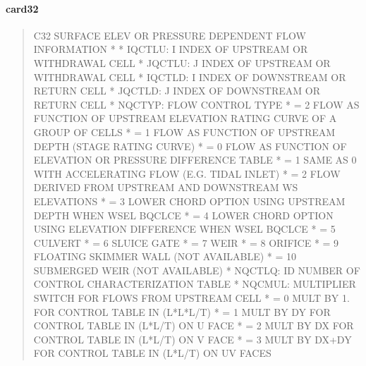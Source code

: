 \documentclass[letterpaper,10pt,english]{sphinxmanual}
\begin{document}
\paragraph{card32}
\label{\detokenize{inputfiles/runcontrol/card32:card32}}\label{\detokenize{inputfiles/runcontrol/card32::doc}}\begin{quote}

\begin{sphinxVerbatim}[commandchars=\\\{\}]
\PYGZhy{}\PYGZhy{}\PYGZhy{}\PYGZhy{}\PYGZhy{}\PYGZhy{}\PYGZhy{}\PYGZhy{}\PYGZhy{}\PYGZhy{}\PYGZhy{}\PYGZhy{}\PYGZhy{}\PYGZhy{}\PYGZhy{}\PYGZhy{}\PYGZhy{}\PYGZhy{}\PYGZhy{}\PYGZhy{}\PYGZhy{}\PYGZhy{}\PYGZhy{}\PYGZhy{}\PYGZhy{}\PYGZhy{}\PYGZhy{}\PYGZhy{}\PYGZhy{}\PYGZhy{}\PYGZhy{}\PYGZhy{}\PYGZhy{}\PYGZhy{}\PYGZhy{}\PYGZhy{}\PYGZhy{}\PYGZhy{}\PYGZhy{}\PYGZhy{}\PYGZhy{}\PYGZhy{}\PYGZhy{}\PYGZhy{}\PYGZhy{}\PYGZhy{}\PYGZhy{}\PYGZhy{}\PYGZhy{}\PYGZhy{}\PYGZhy{}\PYGZhy{}\PYGZhy{}\PYGZhy{}\PYGZhy{}\PYGZhy{}\PYGZhy{}\PYGZhy{}\PYGZhy{}\PYGZhy{}\PYGZhy{}\PYGZhy{}\PYGZhy{}\PYGZhy{}\PYGZhy{}\PYGZhy{}\PYGZhy{}\PYGZhy{}\PYGZhy{}\PYGZhy{}\PYGZhy{}\PYGZhy{}\PYGZhy{}\PYGZhy{}\PYGZhy{}\PYGZhy{}\PYGZhy{}\PYGZhy{}
C32 SURFACE ELEV OR PRESSURE DEPENDENT FLOW INFORMATION
*
*  IQCTLU:  I INDEX OF UPSTREAM OR WITHDRAWAL CELL
*  JQCTLU:  J INDEX OF UPSTREAM OR WITHDRAWAL CELL
*  IQCTLD:  I INDEX OF DOWNSTREAM OR RETURN CELL
*  JQCTLD:  J INDEX OF DOWNSTREAM OR RETURN CELL
*  NQCTYP:  FLOW CONTROL TYPE
*           = \PYGZhy{}2 FLOW AS FUNCTION OF UPSTREAM ELEVATION RATING CURVE OF A GROUP OF CELLS
*           = \PYGZhy{}1 FLOW AS FUNCTION OF UPSTREAM DEPTH (STAGE RATING CURVE)
*           = 0  FLOW AS FUNCTION OF ELEVATION OR PRESSURE DIFFERENCE TABLE
*           = 1  SAME AS 0 WITH ACCELERATING FLOW (E.G. TIDAL INLET)
*           = 2  FLOW DERIVED FROM UPSTREAM AND DOWNSTREAM WS ELEVATIONS
*           = 3  LOWER CHORD OPTION USING UPSTREAM DEPTH       WHEN WSEL \PYGZgt{} BQCLCE
*           = 4  LOWER CHORD OPTION USING ELEVATION DIFFERENCE WHEN WSEL \PYGZgt{} BQCLCE
*           = 5  CULVERT
*           = 6  SLUICE GATE
*           = 7  WEIR
*           = 8  ORIFICE
*           = 9  FLOATING SKIMMER WALL (NOT AVAILABLE) 
*           = 10 SUBMERGED WEIR (NOT AVAILABLE)
*  NQCTLQ:  ID NUMBER OF CONTROL CHARACTERIZATION TABLE
*  NQCMUL:  MULTIPLIER SWITCH FOR FLOWS FROM UPSTREAM CELL
*           = 0  MULT BY 1. FOR CONTROL TABLE IN (L*L*L/T)
*           = 1  MULT BY DY FOR CONTROL TABLE IN (L*L/T) ON U FACE
*           = 2  MULT BY DX FOR CONTROL TABLE IN (L*L/T) ON V FACE
*           = 3  MULT BY DX+DY FOR CONTROL TABLE IN (L*L/T) ON U\PYGZam{}V FACES

\end{sphinxVerbatim}
\end{quote}
\end{document}
